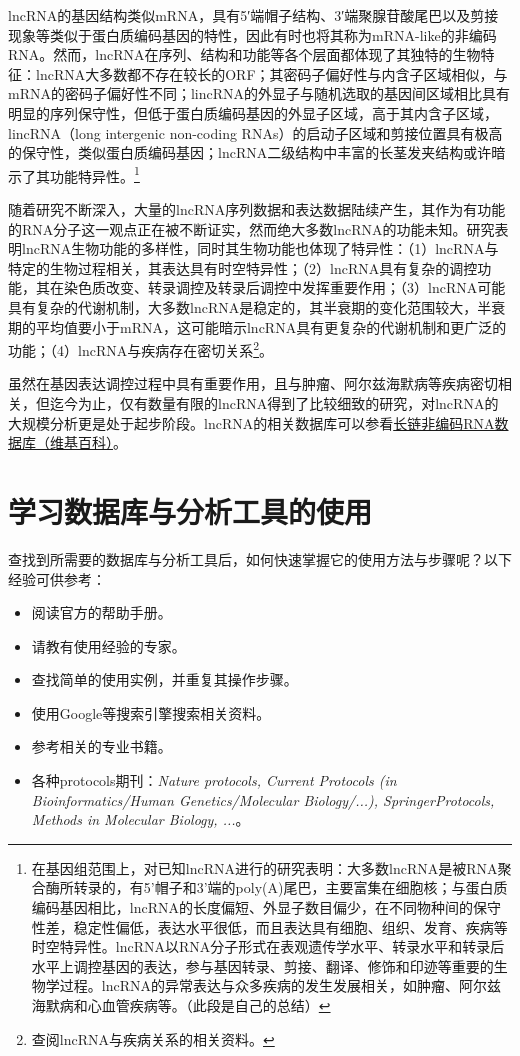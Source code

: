 \documentclass[11pt,a4paper,twoside]{book}
\begin{document}
lncRNA的基因结构类似mRNA，具有5′端帽子结构、3′端聚腺苷酸尾巴以及剪接现象等类似于蛋白质编码基因的特性，因此有时也将其称为mRNA-like的非编码RNA。然而，lncRNA在序列、结构和功能等各个层面都体现了其独特的生物特征：lncRNA大多数都不存在较长的ORF；其密码子偏好性与内含子区域相似，与mRNA的密码子偏好性不同；lincRNA的外显子与随机选取的基因间区域相比具有明显的序列保守性，但低于蛋白质编码基因的外显子区域，高于其内含子区域，lincRNA（long intergenic non-coding RNAs）的启动子区域和剪接位置具有极高的保守性，类似蛋白质编码基因；lncRNA二级结构中丰富的长茎发夹结构或许暗示了其功能特异性。\footnote{在基因组范围上，对已知lncRNA进行的研究表明：大多数lncRNA是被RNA聚合酶所转录的，有5'帽子和3'端的poly(A)尾巴，主要富集在细胞核；与蛋白质编码基因相比，lncRNA的长度偏短、外显子数目偏少，在不同物种间的保守性差，稳定性偏低，表达水平很低，而且表达具有细胞、组织、发育、疾病等时空特异性。lncRNA以RNA分子形式在表观遗传学水平、转录水平和转录后水平上调控基因的表达，参与基因转录、剪接、翻译、修饰和印迹等重要的生物学过程。lncRNA的异常表达与众多疾病的发生发展相关，如肿瘤、阿尔兹海默病和心血管疾病等。（此段是自己的总结）}

随着研究不断深入，大量的lncRNA序列数据和表达数据陆续产生，其作为有功能的RNA分子这一观点正在被不断证实，然而绝大多数lncRNA的功能未知。研究表明lncRNA生物功能的多样性，同时其生物功能也体现了特异性：（1）lncRNA与特定的生物过程相关，其表达具有时空特异性；（2）lncRNA具有复杂的调控功能，其在染色质改变、转录调控及转录后调控中发挥重要作用；（3）lncRNA可能具有复杂的代谢机制，大多数lncRNA是稳定的，其半衰期的变化范围较大，半衰期的平均值要小于mRNA，这可能暗示lncRNA具有更复杂的代谢机制和更广泛的功能；（4）lncRNA与疾病存在密切关系\footnote{查阅lncRNA与疾病关系的相关资料。}。

虽然在基因表达调控过程中具有重要作用，且与肿瘤、阿尔兹海默病等疾病密切相关，但迄今为止，仅有数量有限的lncRNA得到了比较细致的研究，对lncRNA的大规模分析更是处于起步阶段。lncRNA的相关数据库可以参看\href{http://zh.wikipedia.org/wiki/\%E9\%95\%BF\%E9\%93\%BE\%E9\%9D\%9E\%E7\%BC\%96\%E7\%A0\%81RNA\%E6\%95\%B0\%E6\%8D\%AE\%E5\%BA\%93}{长链非编码RNA数据库（维基百科）}。

\section{学习数据库与分析工具的使用}
查找到所需要的数据库与分析工具后，如何快速掌握它的使用方法与步骤呢？以下经验可供参考：
\begin{itemize}
  \item 阅读官方的帮助手册。
  \item 请教有使用经验的专家。
  \item 查找简单的使用实例，并重复其操作步骤。
  \item 使用Google等搜索引擎搜索相关资料。
  \item 参考相关的专业书籍。
  \item 各种protocols期刊：\textit{Nature protocols, Current Protocols (in Bioinformatics/Human Genetics/Molecular Biology/...), SpringerProtocols, Methods in Molecular Biology, ...}。
\end{itemize}
\end{document}
